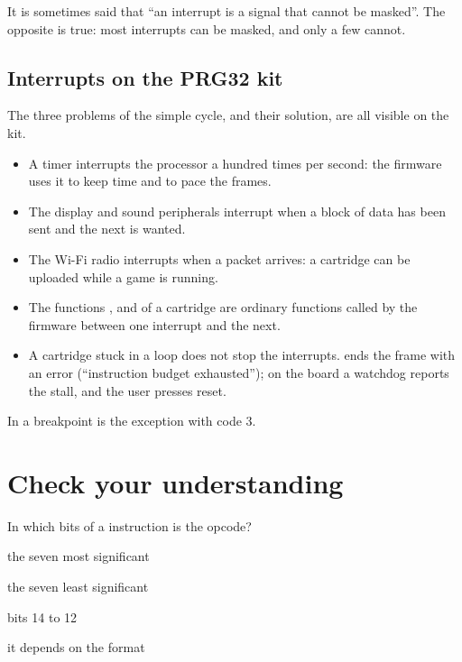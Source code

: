 \begin{prgwarn}
It is sometimes said that ``an interrupt is a signal that cannot be masked''.
The opposite is true: most interrupts can be masked, and only a few cannot.
\end{prgwarn}

\subsection{Interrupts on the PRG32 kit}

The three problems of the simple cycle, and their solution, are all visible
on the kit.

\begin{itemize}
\item A timer interrupts the processor a hundred times per second: the
  firmware uses it to keep time and to pace the frames.
\item The display and sound peripherals interrupt when a block of data has
  been sent and the next is wanted.
\item The Wi-Fi radio interrupts when a packet arrives: a cartridge can be
  uploaded while a game is running.
\item The functions ,  and  of a cartridge
  are ordinary functions called by the firmware between one interrupt and the
  next.
\item A cartridge stuck in a loop does not stop the interrupts. \prgqt ends
  the frame with an error (``instruction budget exhausted''); on the board a
  watchdog reports the stall, and the user presses reset.
\end{itemize}

In \prgqt a breakpoint is the exception with code 3.





\section{Check your understanding}

\begin{quiz}{In which bits of a \riscv instruction is the opcode?}
\item the seven most significant
\item the seven least significant
\item bits 14 to 12
\item it depends on the format
\end{quiz}

